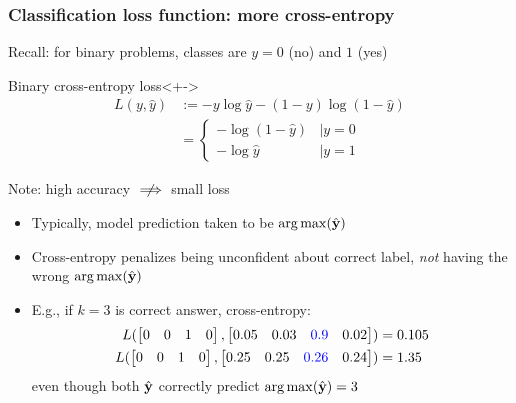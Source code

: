 \begin{frame}
    \frametitle{Classification loss function: more cross-entropy}
    Recall: for binary problems, classes are $y = 0$ (no) and $1$ (yes)

    \begin{block}{Binary cross-entropy loss}<+->
        \vspace{-1em}
        \begin{align*}
            L(y, \hat{y}) &:= -y \log \hat{y} - (1 - y) \log(1 - \hat{y}) \\
            &= \begin{cases}
                -\log(1 - \hat{y}) &\mid y = 0 \\
                -\log \hat{y} &\mid y = 1
            \end{cases}
        \end{align*}
    \end{block}
    \pause

    Note: high accuracy $\centernot\implies$ small loss
    \begin{itemize}
        \item Typically, model prediction taken to be $\operatorname*{arg\,max}(\hat{\mathbf{y}})$
        \item Cross-entropy penalizes being unconfident about correct label, \emph{not} having the wrong $\operatorname*{arg\,max}(\hat{\mathbf{y}})$
        \pause
        \item E.g., if $k = 3$ is correct answer, cross-entropy:
        \begin{align*}
            L(
                \begin{bmatrix} 0 & 0 & 1 & 0 \end{bmatrix},
                \begin{bmatrix}
                    0.05 & 0.03 & \textcolor{blue}{0.9} & 0.02
                \end{bmatrix}
            ) &= 0.105 \\
            L(
                \begin{bmatrix} 0 & 0 & 1 & 0 \end{bmatrix},
                \begin{bmatrix}
                    0.25 & 0.25 & \textcolor{blue}{0.26} & 0.24
                \end{bmatrix}
            ) &= 1.35
        \end{align*}
        even though both $\hat{\mathbf{y}}$ correctly predict $\operatorname*{arg\,max}(\hat{\mathbf{y}}) = 3$
    \end{itemize}
\end{frame}

